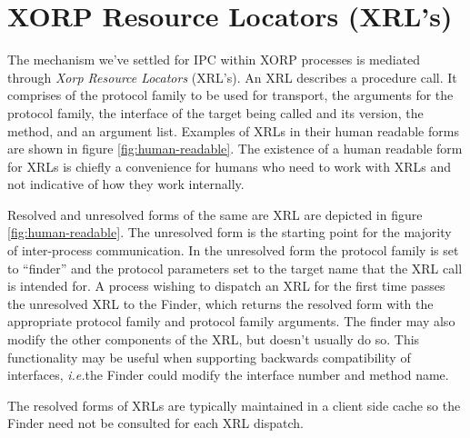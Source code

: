 \documentclass[11pt]{article}
\newcommand{\ie}{\emph{i.e.\/}} %
\begin{document}
\section{XORP Resource Locators (XRL's)}

The mechanism we've settled for IPC within XORP processes is mediated
through \emph{Xorp Resource Locators} (XRL's).  An XRL describes a
procedure call.  It comprises of the protocol family to be used for
transport, the arguments for the protocol family, the interface of the
target being called and its version, the method, and an argument
list.  Examples of XRLs in their human readable forms are shown in
figure \ref{fig:human-readable}.  The existence of a human readable
form for XRLs is chiefly a convenience for humans who need to work
with XRLs and not indicative of how they work internally.

Resolved and unresolved forms of the same are XRL are depicted in
figure \ref{fig:human-readable}.  The unresolved form is the starting
point for the majority of inter-process communication.  In the
unresolved form the protocol family is set to ``finder'' and the
protocol parameters set to the target name that the XRL call is
intended for.  A process wishing to dispatch an XRL for the first time
passes the unresolved XRL to the Finder, which returns the resolved
form with the appropriate protocol family and protocol family
arguments.  The finder may also modify the other components of the
XRL, but doesn't usually do so.  This functionality may be useful when
supporting backwards compatibility of interfaces, \ie the Finder could
modify the interface number and method name.

The resolved forms of XRLs are typically maintained in a client side
cache so the Finder need not be consulted for each XRL dispatch.
\end{document}

